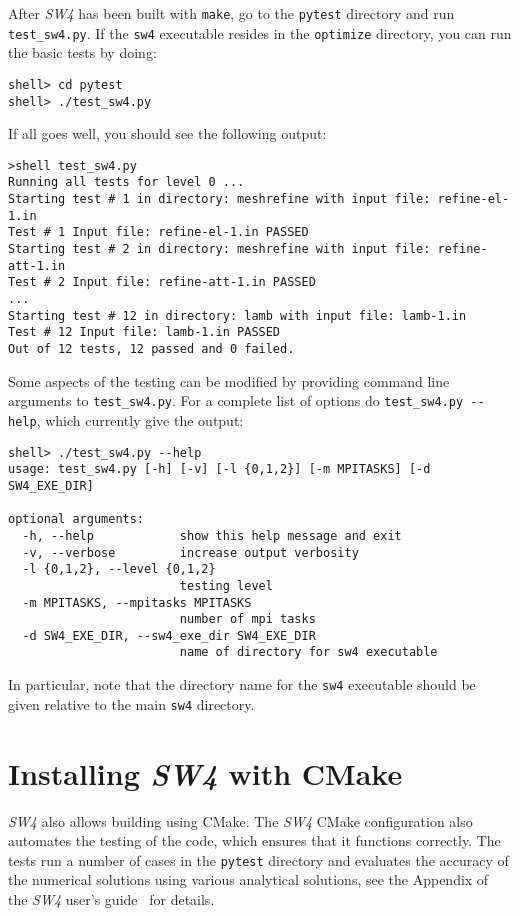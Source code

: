 \documentclass[11pt]{article}
\begin{document}
After \emph{SW4} has been built with \verb+make+, go to the \verb+pytest+ directory and run
\verb+test_sw4.py+. If the \verb+sw4+ executable resides in the \verb+optimize+ directory, you can run
the basic tests by doing:
\begin{verbatim}
shell> cd pytest
shell> ./test_sw4.py
\end{verbatim}
If all goes well, you should see the following output:
\begin{verbatim}
>shell test_sw4.py
Running all tests for level 0 ...
Starting test # 1 in directory: meshrefine with input file: refine-el-1.in
Test # 1 Input file: refine-el-1.in PASSED
Starting test # 2 in directory: meshrefine with input file: refine-att-1.in
Test # 2 Input file: refine-att-1.in PASSED
...
Starting test # 12 in directory: lamb with input file: lamb-1.in
Test # 12 Input file: lamb-1.in PASSED
Out of 12 tests, 12 passed and 0 failed.
\end{verbatim}
Some aspects of the testing can be modified by providing command line arguments to
\verb+test_sw4.py+. For a complete list of options do \verb+test_sw4.py --help+, which currently
give the output:
\begin{verbatim}
shell> ./test_sw4.py --help
usage: test_sw4.py [-h] [-v] [-l {0,1,2}] [-m MPITASKS] [-d SW4_EXE_DIR]

optional arguments:
  -h, --help            show this help message and exit
  -v, --verbose         increase output verbosity
  -l {0,1,2}, --level {0,1,2}
                        testing level
  -m MPITASKS, --mpitasks MPITASKS
                        number of mpi tasks
  -d SW4_EXE_DIR, --sw4_exe_dir SW4_EXE_DIR
                        name of directory for sw4 executable
\end{verbatim}
In particular, note  that the directory name for the \verb+sw4+ executable should be given relative to the main
\verb+sw4+ directory.

\section{Installing \emph{SW4} with CMake}\label{cha:installing-cmake-sw4}
\emph{SW4} also allows building using CMake.  The \emph{SW4} CMake configuration also automates the
testing of the code, which ensures that it functions correctly. The tests run a number of cases in
the \verb+pytest+ directory and evaluates the accuracy of the numerical solutions using various
analytical solutions, see the Appendix of the \emph{SW4} user's guide~\cite{SW4-11} for details.
\end{document}
